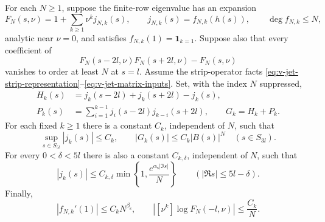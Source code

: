 \begin{lemma}\label{lem:v-higher-twist-jets}
For each $N\ge1$, suppose the finite-row eigenvalue has an expansion
\[
 F_N(s,\nu)=1+\sum_{k\ge1}\nu^k j_{N,k}(s),
 \qquad j_{N,k}(s)=f_{N,k}(h(s)),\qquad \deg f_{N,k}\le N,
\]
analytic near $\nu=0$, and satisfies $f_{N,k}(1)=\mathbf1_{k=1}$.
Suppose also that every coefficient of
\[
 F_N(s-2 l,\nu)F_N(s+2 l,\nu)-F_N(s,\nu)
\]
vanishes to order at least $N$ at $s= l$.
Assume the strip-operator facts
\eqref{eq:v-jet-strip-representation}--\eqref{eq:v-jet-matrix-inputs}.
Set, with the index $N$ suppressed,
\[
 \begin{split}
 H_k(s)&=j_k(s-2 l)+j_k(s+2 l)-j_k(s),\\
 P_k(s)&=\sum_{i=1}^{k-1}j_i(s-2 l)j_{k-i}(s+2 l),
 \qquad G_k=H_k+P_k.
 \end{split}
\]
For each fixed $k\ge1$ there is a constant $C_k$, independent of $N$,
such that
\begin{equation}\label{eq:v-jet-full-strip-conclusion}
 \sup_{s\in S_{5 l}}|j_k(s)|\le C_k,
 \qquad |G_k(s)|\le C_k|B(s)|^N\quad(s\in S_{3 l}).
\end{equation}
For every $0<\delta<5 l$ there is also a constant $C_{k,\delta}$,
independent of $N$, such that
\begin{equation}\label{eq:v-jet-sharp-conclusion}
 |j_k(s)|\le C_{k,\delta}
       \min\left\{1,\frac{e^{\alpha_{\mathrm s}|\Im s|}}N\right\}
 \qquad (|\Re s|\le5 l-\delta).
\end{equation}
Finally,
\begin{equation}\label{eq:v-jet-endpoint-conclusion}
 |f_{N,k}'(1)|\le C_k N^{\beta_{\mathrm s}},\qquad
 |[\nu^k]\log F_N(- l,\nu)|\le\frac{C_k}{N}.
\end{equation}
\end{lemma}


